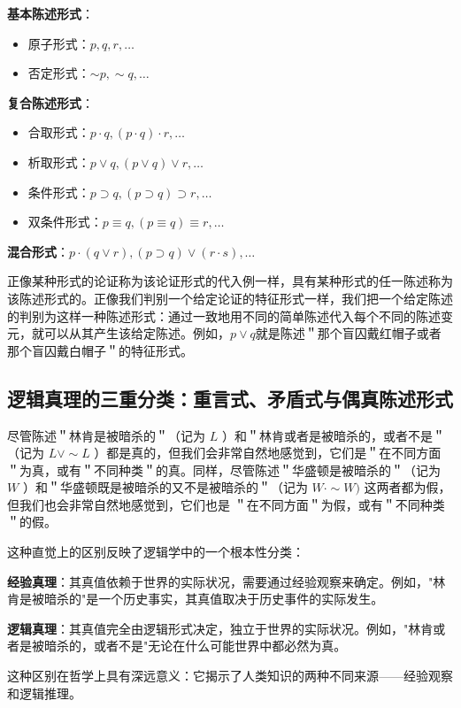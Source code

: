 \begin{examplebox}[title=陈述形式的分类体系]
\textbf{基本陈述形式}：
\begin{itemize}
\item 原子形式：$p, q, r, \ldots$
\item 否定形式：$\sim p, \sim q, \ldots$
\end{itemize}

\textbf{复合陈述形式}：
\begin{itemize}
\item 合取形式：$p \cdot q, (p \cdot q) \cdot r, \ldots$
\item 析取形式：$p \vee q, (p \vee q) \vee r, \ldots$
\item 条件形式：$p \supset q, (p \supset q) \supset r, \ldots$
\item 双条件形式：$p \equiv q, (p \equiv q) \equiv r, \ldots$
\end{itemize}

\textbf{混合形式}：$p \cdot (q \vee r), (p \supset q) \vee (r \cdot s), \ldots$
\end{examplebox}

正像某种形式的论证称为该论证形式的代入例一样，具有某种形式的任一陈述称为该陈述形式的。正像我们判别一个给定论证的特征形式一样，我们把一个给定陈述的判别为这样一种陈述形式：通过一致地用不同的简单陈述代入每个不同的陈述变元，就可以从其产生该给定陈述。例如，$p \vee q$就是陈述＂那个盲囚戴红帽子或者那个盲囚戴白帽子＂的特征形式。

\subsection{逻辑真理的三重分类：重言式、矛盾式与偶真陈述形式}

尽管陈述＂林肯是被暗杀的＂（记为 $L$ ）和＂林肯或者是被暗杀的，或者不是＂（记为 $L \vee \sim L$ ）都是真的，但我们会非常自然地感觉到，它们是＂在不同方面＂为真，或有＂不同种类＂的真。同样，尽管陈述＂华盛顿是被暗杀的＂（记为 $W$ ）和＂华盛顿既是被暗杀的又不是被暗杀的＂（记为 $W \cdot \sim W)$ 这两者都为假，但我们也会非常自然地感觉到，它们也是 ＂在不同方面＂为假，或有＂不同种类＂的假。

\begin{theorembox}[title=逻辑真理与经验真理的根本区别]
这种直觉上的区别反映了逻辑学中的一个根本性分类：

\textbf{经验真理}：其真值依赖于世界的实际状况，需要通过经验观察来确定。例如，"林肯是被暗杀的"是一个历史事实，其真值取决于历史事件的实际发生。

\textbf{逻辑真理}：其真值完全由逻辑形式决定，独立于世界的实际状况。例如，"林肯或者是被暗杀的，或者不是"无论在什么可能世界中都必然为真。

这种区别在哲学上具有深远意义：它揭示了人类知识的两种不同来源——经验观察和逻辑推理。
\end{theorembox}

